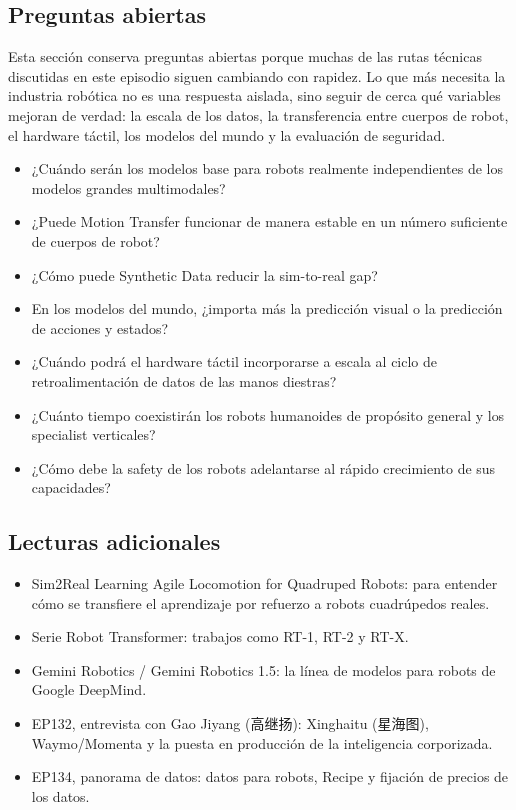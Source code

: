 \subsection{Preguntas abiertas}

Esta sección conserva preguntas abiertas porque muchas de las rutas técnicas discutidas en este episodio siguen cambiando con rapidez. Lo que más necesita la industria robótica no es una respuesta aislada, sino seguir de cerca qué variables mejoran de verdad: la escala de los datos, la transferencia entre cuerpos de robot, el hardware táctil, los modelos del mundo y la evaluación de seguridad.

\begin{itemize}
\item ¿Cuándo serán los modelos base para robots realmente independientes de los modelos grandes multimodales?
\item ¿Puede Motion Transfer funcionar de manera estable en un número suficiente de cuerpos de robot?
\item ¿Cómo puede Synthetic Data reducir la sim-to-real gap?
\item En los modelos del mundo, ¿importa más la predicción visual o la predicción de acciones y estados?
\item ¿Cuándo podrá el hardware táctil incorporarse a escala al ciclo de retroalimentación de datos de las manos diestras?
\item ¿Cuánto tiempo coexistirán los robots humanoides de propósito general y los specialist verticales?
\item ¿Cómo debe la safety de los robots adelantarse al rápido crecimiento de sus capacidades?
\end{itemize}

\subsection{Lecturas adicionales}

\begin{itemize}
\item Sim2Real Learning Agile Locomotion for Quadruped Robots: para entender cómo se transfiere el aprendizaje por refuerzo a robots cuadrúpedos reales.
\item Serie Robot Transformer: trabajos como RT-1, RT-2 y RT-X.
\item Gemini Robotics / Gemini Robotics 1.5: la línea de modelos para robots de Google DeepMind.
\item EP132, entrevista con Gao Jiyang (高继扬): Xinghaitu (星海图), Waymo/Momenta y la puesta en producción de la inteligencia corporizada.
\item EP134, panorama de datos: datos para robots, Recipe y fijación de precios de los datos.
\end{itemize}

